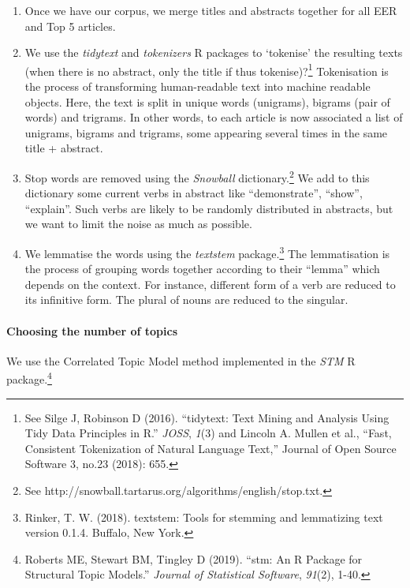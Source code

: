 \documentclass[]{elsarticle} %
\providecommand{\tightlist}{%
  \setlength{\itemsep}{0pt}\setlength{\parskip}{0pt}}
\begin{document}
\begin{enumerate}
\def\labelenumi{\arabic{enumi}.}
\tightlist
\item
  Once we have our corpus, we merge titles and abstracts together for
  all EER and Top 5 articles.
\item
  We use the \emph{tidytext} and \emph{tokenizers} R packages to
  `tokenise' the resulting texts (when there is no abstract, only the
  title if thus tokenise)?\footnote{See Silge J, Robinson D (2016).
    ``tidytext: Text Mining and Analysis Using Tidy Data Principles in
    R.'' \emph{JOSS}, \emph{1}(3) and Lincoln A. Mullen et al., ``Fast,
    Consistent Tokenization of Natural Language Text,'' Journal of Open
    Source Software 3, no.23 (2018): 655.} Tokenisation is the process
  of transforming human-readable text into machine readable objects.
  Here, the text is split in unique words (unigrams), bigrams (pair of
  words) and trigrams. In other words, to each article is now associated
  a list of unigrams, bigrams and trigrams, some appearing several times
  in the same title + abstract.
\item
  Stop words are removed using the \emph{Snowball}
  dictionary.\footnote{See
    http://snowball.tartarus.org/algorithms/english/stop.txt.} We add to
  this dictionary some current verbs in abstract like ``demonstrate'',
  ``show'', ``explain''. Such verbs are likely to be randomly
  distributed in abstracts, but we want to limit the noise as much as
  possible.
\item
  We lemmatise the words using the \emph{textstem} package.\footnote{Rinker,
    T. W. (2018). textstem: Tools for stemming and lemmatizing text
    version 0.1.4. Buffalo, New York.} The lemmatisation is the process
  of grouping words together according to their ``lemma'' which depends
  on the context. For instance, different form of a verb are reduced to
  its infinitive form. The plural of nouns are reduced to the singular.
\end{enumerate}

\hypertarget{choosing-the-number-of-topics}{%
\paragraph*{Choosing the number of
topics}\label{choosing-the-number-of-topics}}

We use the Correlated Topic Model \citep{blei2007} method implemented in
the \emph{STM} R package.\footnote{Roberts ME, Stewart BM, Tingley D
  (2019). ``stm: An R Package for Structural Topic Models.''
  \emph{Journal of Statistical Software}, \emph{91}(2), 1-40.}
\end{document}
